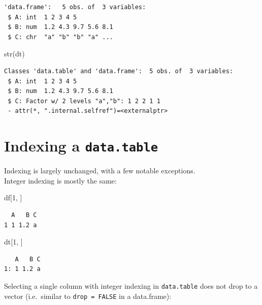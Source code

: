 \documentclass[
]{book}
\newenvironment{Shaded}{\begin{snugshade}}{\end{snugshade}}
\newcommand{\DecValTok}[1]{\textcolor[rgb]{0.00,0.00,0.81}{#1}}
\newcommand{\FunctionTok}[1]{\textcolor[rgb]{0.00,0.00,0.00}{#1}}
\newcommand{\NormalTok}[1]{#1}
\begin{document}
\begin{verbatim}
'data.frame':   5 obs. of  3 variables:
 $ A: int  1 2 3 4 5
 $ B: num  1.2 4.3 9.7 5.6 8.1
 $ C: chr  "a" "b" "b" "a" ...
\end{verbatim}

\begin{Shaded}
\begin{Highlighting}[]
\FunctionTok{str}\NormalTok{(dt)}
\end{Highlighting}
\end{Shaded}

\begin{verbatim}
Classes 'data.table' and 'data.frame':  5 obs. of  3 variables:
 $ A: int  1 2 3 4 5
 $ B: num  1.2 4.3 9.7 5.6 8.1
 $ C: Factor w/ 2 levels "a","b": 1 2 2 1 1
 - attr(*, ".internal.selfref")=<externalptr> 
\end{verbatim}

\hypertarget{indexing-a-data.table}{%
\section{\texorpdfstring{Indexing a \texttt{data.table}}{Indexing a data.table}}\label{indexing-a-data.table}}

Indexing is largely unchanged, with a few notable exceptions.\\
Integer indexing is mostly the same:

\begin{Shaded}
\begin{Highlighting}[]
\NormalTok{df[}\DecValTok{1}\NormalTok{, ]}
\end{Highlighting}
\end{Shaded}

\begin{verbatim}
  A   B C
1 1 1.2 a
\end{verbatim}

\begin{Shaded}
\begin{Highlighting}[]
\NormalTok{dt[}\DecValTok{1}\NormalTok{, ]}
\end{Highlighting}
\end{Shaded}

\begin{verbatim}
   A   B C
1: 1 1.2 a
\end{verbatim}

Selecting a single column with integer indexing in \texttt{data.table} does not drop to a vector (i.e.~similar to \texttt{drop\ =\ FALSE} in a data.frame):
\end{document}
